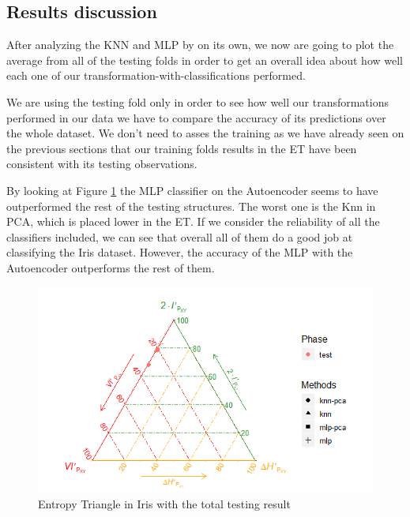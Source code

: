 \subsection{Results discussion} 

After analyzing the KNN and MLP by on its own, we now are going to plot the average from all of the testing folds in order to get an overall idea about how well each one of our transformation-with-classifications performed.               

We are using the testing fold only in order to see how well our transformations performed in our data we have to compare the accuracy of its predictions over the whole dataset. We don't need to asses the training as we have already seen on the previous sections that our training folds results in the ET have been consistent with its testing observations. \par

By looking at Figure \ref{fig:figure_ET_Total_Testing_Iris} the MLP classifier on the Autoencoder seems to have outperformed the rest of the testing structures. The worst one is the Knn in PCA, which is placed lower in the ET. If we consider the reliability of all the classifiers included, we can see that overall all of them do a good job at classifying the Iris dataset. However, the accuracy of the MLP with the Autoencoder outperforms the rest of them.
%
\begin{figure}[H]
	\includegraphics[width=1\linewidth]{Figuras_tfg/ET_Iris_Total_Results}
	\caption{Entropy Triangle in Iris with the total testing result}
	\label{fig:figure_ET_Total_Testing_Iris}
\end{figure}


